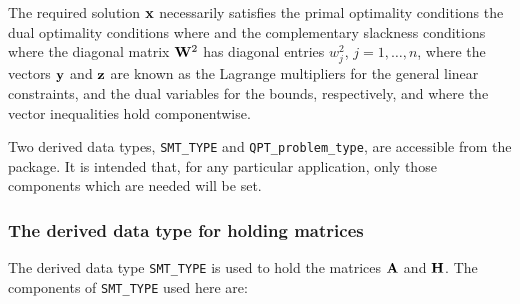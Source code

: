 \documentclass{galahad}
\newcommand{\packagename}{QPT}
\begin{document}
The required solution ${\mathbf{x}}$ necessarily satisfies
the primal optimality conditions
the dual optimality conditions
where
and the complementary slackness conditions
where the diagonal matrix ${\mathbf{W}}^{2}$ has diagonal entries $w_{j}^{2}$,
$j = 1, \ldots , n$, where the vectors ${\mathbf{y}}$ and ${\mathbf{z}}$ are
known as the Lagrange multipliers for
the general linear constraints, and the dual variables for the bounds,
respectively, and where the vector inequalities hold componentwise.





\galtype
Two derived data types,
{\tt SMT\_TYPE} and
{\tt \packagename\_problem\_type},
are accessible from the package. It is intended that, for any particular
application, only those components which are needed will be set.


\subsubsection{The derived data type for holding matrices}\label{typesmt}
The derived data type {\tt SMT\_TYPE} is used to hold the matrices ${\mathbf{A}}$
and ${\mathbf{H}}$. The components of {\tt SMT\_TYPE} used here are:
\end{document}
